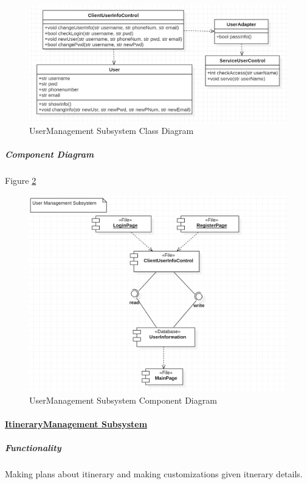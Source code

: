 \documentclass[10pt]{article}
\begin{document}
\begin{figure}[H]
	\centering
	
	\includegraphics[width=14cm]{usermanageclass.png}
	\caption{UserManagement Subsystem Class Diagram}
	\label{UserManagement Subsystem Class Diagram}
\end{figure}

\subparagraph{Component Diagram} Figure \ref{UserManagement Subsystem Component Diagram}

\begin{figure}[H]
	\centering
	
	\includegraphics[width=14cm]{usermanagecom.png}
	\caption{UserManagement Subsystem Component Diagram}
	\label{UserManagement Subsystem Component Diagram}
\end{figure}

\paragraph{\underline{ItineraryManagement Subsystem}}
\subparagraph{Functionality} Making plans about itinerary and making customizations given itnerary details.
\end{document}
